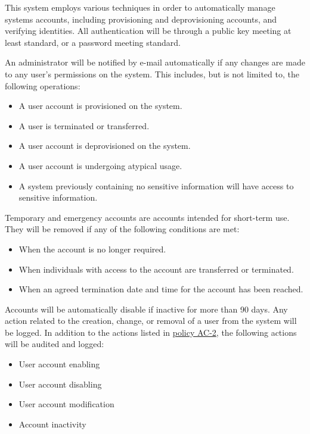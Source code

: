 \begin{policy}[AC-2]
  \label{AC2}
  This system employs various techniques in order to automatically manage
  systems accounts, including provisioning and deprovisioning accounts, and
  verifying identities. All authentication will be through a public key meeting
  at least \fixme standard, or a password meeting \fixme standard.

  An administrator will be notified by e-mail automatically if any changes are
  made to any user's permissions on the system. This includes, but is not
  limited to, the following operations:
  \begin{itemize}
    \item A user account is provisioned on the system.
    \item A user is terminated or transferred.
    \item A user account is deprovisioned on the system.
    \item A user account is undergoing atypical usage.
    \item A system previously containing no sensitive information will have
      access to sensitive information.
  \end{itemize}
  Temporary and emergency accounts are accounts intended for short-term use.
  They will be removed if any of the following conditions are met:
  \begin{itemize}
    \item When the account is no longer required.
    \item When individuals with access to the account are transferred or
      terminated.
    \item When an agreed termination date and time for the account has been
      reached.
  \end{itemize}
  Accounts will be automatically disable if inactive for more than 90 days.
  Any action related to the creation, change, or removal of a user from the
  system will be logged. In addition to the actions listed in
  \hyperref[AC2]{policy AC-2}, the following actions will be audited and
  logged:
  \begin{itemize}
    \item User account enabling
    \item User account disabling
    \item User account modification
    \item Account inactivity
  \end{itemize}
\end{policy}

